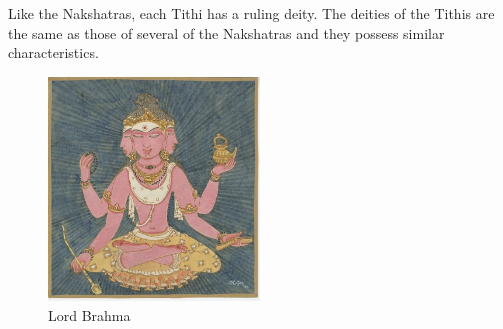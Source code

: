 Like the Nakshatras, each Tithi has a ruling deity. The deities of the Tithis are the same as those of several of the Nakshatras and they possess similar characteristics.

 \begin{figure}[H]
 \centering
\includegraphics[width=0.5\textwidth]{pics/Brahma.png}
\caption{ Lord Brahma}
 \end{figure}

 

